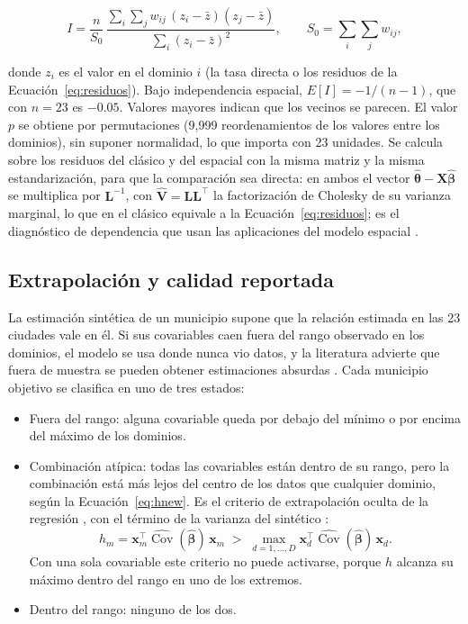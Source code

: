 \begin{equation}
    I = \frac{n}{S_0}\, \frac{\sum_i \sum_j w_{ij}\,(z_i - \bar{z})(z_j - \bar{z})}{\sum_i (z_i - \bar{z})^2}, \qquad S_0 = \sum_i\sum_j w_{ij},
    \label{eq:moran}
\end{equation}

donde $z_i$ es el valor en el dominio $i$ (la tasa directa o los residuos de la Ecuación~\ref{eq:residuos}). Bajo independencia espacial, $E[I] = -1/(n-1)$, que con $n = 23$ es $-0.05$. Valores mayores indican que los vecinos se parecen. El valor $p$ se obtiene por permutaciones (9,999 reordenamientos de los valores entre los dominios), sin suponer normalidad, lo que importa con 23 unidades. Se calcula sobre los residuos del clásico y del espacial con la misma matriz y la misma estandarización, para que la comparación sea directa: en ambos el vector $\hat{\boldsymbol{\theta}} - \mathbf{X}\hat{\boldsymbol{\beta}}$ se multiplica por $\mathbf{L}^{-1}$, con $\hat{\mathbf{V}} = \mathbf{L}\mathbf{L}^\top$ la factorización de Cholesky de su varianza marginal, lo que en el clásico equivale a la Ecuación~\ref{eq:residuos}; es el diagnóstico de dependencia que usan las aplicaciones del modelo espacial \cite[p.~130]{PratesiSalvati2008}.

\subsection{Extrapolación y calidad reportada}
\label{subsec:extrapolacion}

La estimación sintética de un municipio supone que la relación estimada en las 23 ciudades vale en él. Si sus covariables caen fuera del rango observado en los dominios, el modelo se usa donde nunca vio datos, y la literatura advierte que fuera de muestra se pueden obtener estimaciones absurdas \cite[p.~453]{morales2021smallarea}. Cada municipio objetivo se clasifica en uno de tres estados:

\begin{itemize}
    \item Fuera del rango: alguna covariable queda por debajo del mínimo o por encima del máximo de los dominios.
    \item Combinación atípica: todas las covariables están dentro de su rango, pero la combinación está más lejos del centro de los datos que cualquier dominio, según la Ecuación~\ref{eq:hnew}. Es el criterio de extrapolación oculta de la regresión \cite[sec.~3.8]{MontgomeryPeckVining2012}, con el término de la varianza del sintético \cite[p.~441]{morales2021smallarea}:
    \begin{equation}
        h_m = \mathbf{x}_m^\top \widehat{\operatorname{Cov}}(\hat{\boldsymbol{\beta}})\,\mathbf{x}_m \;>\; \max_{d=1,\ldots,D} \mathbf{x}_d^\top \widehat{\operatorname{Cov}}(\hat{\boldsymbol{\beta}})\,\mathbf{x}_d .
        \label{eq:hnew}
    \end{equation}
    Con una sola covariable este criterio no puede activarse, porque $h$ alcanza su máximo dentro del rango en uno de los extremos.
    \item Dentro del rango: ninguno de los dos.
\end{itemize}

